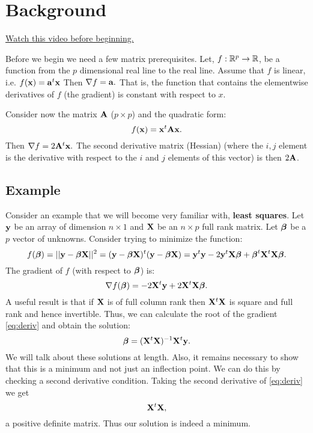 \chapter{Background}
\label{chap:background}

\href{https://www.youtube.com/watch?v=TrZdG642M4g&index=1&list=PLpl-gQkQivXhdgUCdaUQcdb31CRe8Mm2y}{Watch this video before beginning.}

Before we begin we need a few matrix prerequisites. Let,
$f: \mathbb{R}^p \rightarrow \mathbb{R}$,
be a function from the $p$ dimensional real line to the real line.
Assume that $f$ is linear, i.e. $f(\mathbf{x}) = \mathbf{a}^t \mathbf{x}$
Then $ \nabla f = \mathbf{a}.$ That is, the function that
contains the elementwise derivatives of $f$ (the gradient)
is constant with respect to $x$. 

Consider now the matrix $\mathbf{A}$
($p\times p$) and the quadratic form:
$$
f(\mathbf{x}) =  \mathbf{x}^t \mathbf{A} \mathbf{x}.
$$
Then  $ \nabla f = 2 \mathbf{A}^t \mathbf{x}.$ The second derivative matrix (Hessian)
(where the $i, j$ element is the derivative
with respect to the $i$ and $j$ elements of this vector)
is then $2 \mathbf{A} $.

\section{Example}

Consider an example that we will become very familiar with, {\bf least squares}.
Let $\mathbf{y}$ be an array of dimension $n\times 1$ and 
$\mathbf{X}$ be an $n\times p$ full rank matrix. Let $\boldsymbol{\beta}$ be a
$p$ vector of unknowns. Consider trying to minimize the function:
$$
f(\boldsymbol{\beta}) = ||\mathbf{y} - \boldsymbol{\beta} \mathbf{X}||^2 = (\mathbf{y} - \boldsymbol{\beta} \mathbf{X})^t (\mathbf{y} - \boldsymbol{\beta} \mathbf{X})
= \mathbf{y}^t \mathbf{y} - 2 \mathbf{y}^t \mathbf{X} \boldsymbol{\beta} + \boldsymbol{\beta}^t \mathbf{X}^t \mathbf{X} \boldsymbol{\beta}.
$$
The gradient of $f$ (with respect to $\boldsymbol{\beta}$) is:
\begin{equation}
\label{eq:deriv}
\nabla f(\boldsymbol{\beta}) = -2 \mathbf{X}^t \mathbf{y} + 2 \mathbf{X}^t\mathbf{X} \boldsymbol{\beta}.
\end{equation}
A useful result is that if $\mathbf{X}$ is of full column rank then
$\mathbf{X}^t \mathbf{X}$ is square and full rank and hence invertible. Thus, we can
calculate the root of the gradient \eqref{eq:deriv} and obtain the solution:
$$
\boldsymbol{\beta} = (\mathbf{X}^t \mathbf{X})^{-1} \mathbf{X}^t \mathbf{y}. 
$$
We will talk about these solutions at length. Also, it remains
necessary to show that this is a minimum and not just an
inflection point. We can do this by checking a second derivative
condition. Taking the second derivative of \eqref{eq:deriv} we 
get
$$
\mathbf{X}^t\mathbf{X},
$$
a positive definite matrix. Thus our solution is indeed a minimum.

